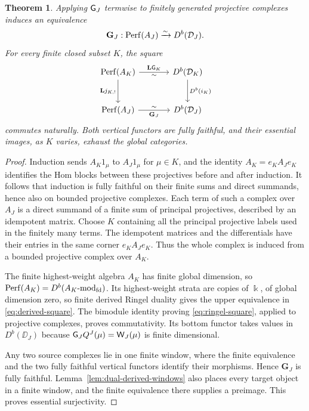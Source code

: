 \documentclass[11pt,reqno]{amsart}
\newcommand{\kk}{\Bbbk}\newcommand{\ZZ}{\mathbb Z}\newcommand{\NN}{\mathbb N}
\newtheorem{theorem}{Theorem}[section]
\theoremstyle{definition}
\theoremstyle{remark}
\numberwithin{equation}{section}
\begin{document}
\begin{theorem}\label{thm:derived}
Applying $\mathsf G_J$ termwise to finitely generated projective complexes
induces an equivalence
\[
 \mathbf G_J:\operatorname{Perf}(A_J)\xrightarrow{\sim}D^b(\mathcal D_J).
\]
For every finite closed subset $K$, the square
\begin{equation}\label{eq:derived-square}
\begin{tikzcd}[column sep=large,row sep=large]
 \Perf(A_K) \arrow[r,"\mathbf L\GK","\sim"']
       \arrow[d,"\mathbf L j_{K,!}"'] &
 D^b(\DD_K) \arrow[d,"D^b(i_K)"] \\
 \Perf(A_J) \arrow[r,"\mathbf G_J"',"\sim"] & D^b(\DD_J)
\end{tikzcd}
\end{equation}
commutes naturally. Both vertical functors are fully faithful, and
their essential images, as $K$ varies, exhaust the global categories.
\end{theorem}

\begin{proof}
Induction sends $A_K1_\mu$ to $A_J1_\mu$ for $\mu\in K$, and the
identity $A_K=e_KA_Je_K$ identifies the Hom blocks between these
projectives before and after induction. It follows that induction is
fully faithful on their finite sums and direct summands, hence also on
bounded projective complexes. Each term of such a complex over $A_J$
is a direct summand of a finite sum of principal projectives, described
by an idempotent matrix. Choose $K$ containing all the principal
projective labels used in the finitely many terms. The idempotent
matrices and the differentials have their entries in the same corner
$e_KA_Je_K$. Thus the whole complex is induced from a bounded
projective complex over $A_K$.

The finite highest-weight algebra $A_K$ has finite global dimension,
so $\operatorname{Perf}(A_K)=D^b(A_K\text{-}\mathrm{mod}_{\mathrm{fd}})$.
Its highest-weight strata are copies of $\kk$, of global dimension
zero, so finite derived Ringel duality \cite[Theorem~4.16]{BS}
gives the upper equivalence in \eqref{eq:derived-square}.
The bimodule identity proving
\eqref{eq:ringel-square}, applied to projective complexes, proves
commutativity. Its bottom functor takes values in $D^b(\DD_J)$ because
$\mathsf G_J Q^J(\mu)=\mathsf W_J(\mu)$ is finite dimensional.

Any two source complexes lie in one finite window, where the finite
equivalence and the two fully faithful vertical functors identify
their morphisms. Hence $\mathbf G_J$ is fully faithful.
Lemma~\ref{lem:dual-derived-windows} also places every target object
in a finite window, and the finite equivalence there supplies a
preimage. This proves essential surjectivity.
\end{proof}
\end{document}
